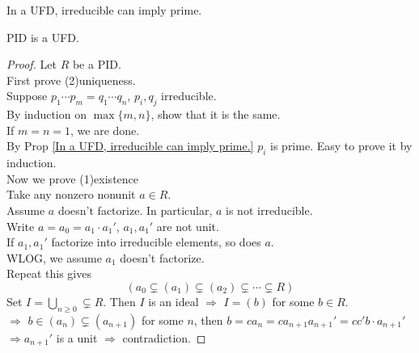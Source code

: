 \begin{proposition}\label{In a UFD, irreducible can imply prime.}
     In a UFD, irreducible can imply prime.
\end{proposition}
\begin{theorem}
     PID is a UFD.
\end{theorem}
\begin{proof}
     Let  $ R  $ be a PID.\\
     First prove (2)uniqueness.\\
     Suppose  $ p_1\cdots p_m=q_1\cdots q_n $,  $ p_i ,q_j  $ irreducible.\\
     By induction on  $ \max\{m,n\} $, show that it is the same.\\
     If  $ m=n=1  $, we are done.\\
     By Prop \ref{In a UFD, irreducible can imply prime.}  $ p_i  $ is prime. Easy to prove it by induction.\\
     Now we prove (1)existence\\
     Take any nonzero nonunit  $ a\in R $.\\
     Assume  $ a  $ doesn't factorize. In particular,   $ a  $ is not irreducible.\\
     Write  $ a=a_0=a_1\cdot a_1' $,  $ a_1,a_1'  $ are not unit.\\
     If  $ a_1,a_1' $ factorize into irreducible elements, so does  $ a $.\\
     WLOG, we assume  $ a_1  $ doesn't factorize.\\
     Repeat this gives
     \[(a_0\subsetneq (a_1)\subsetneq (a_2)\subsetneq\cdots\subsetneq R)\]
     Set  $ I=\bigcup\limits_{n \geq 0}\subsetneq R $. Then  $ I  $ is an ideal  $ \Rightarrow  $  $ I=(b)  $ for some  $ b\in R  $.\\
       $ \Rightarrow $    $ b\in (a_n)\subsetneq(a_{n+1}) $ for some  $ n $, then  $ b=ca_n=ca_{n+1}a_{n+1}'=cc'b\cdot a_{n+1}' $\\
        $ \Rightarrow a_{n+1}'  $ is  a unit $ \Rightarrow  $ contradiction.      
\end{proof}
